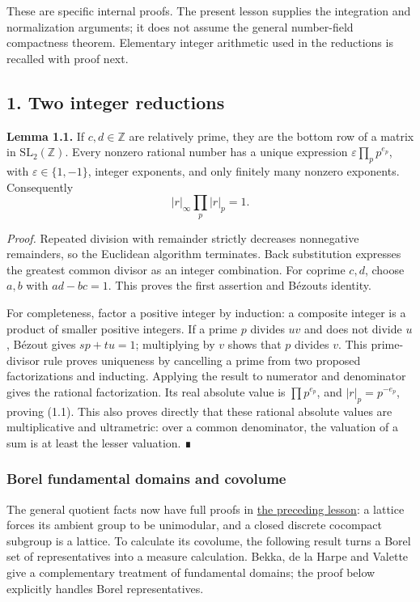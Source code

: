 \documentclass[
  english,
  11pt,
  a4paper,
]{article}
\begin{document}
These are specific internal proofs. The present lesson supplies the
integration and normalization arguments; it does not assume the general
number-field compactness theorem. Elementary integer arithmetic used in
the reductions is recalled with proof next.

\subsection{1. Two integer
reductions}\label{finite-covolume-and-arithmetic-quotients--1-two-integer-reductions}

\textbf{Lemma 1.1.} If \(c,d\in\mathbb Z\) are relatively prime, they
are the bottom row of a matrix in \(\mathrm{SL}_2(\mathbb Z)\). Every
nonzero rational number has a unique expression
\(\varepsilon\prod_p p^{e_p}\), with \(\varepsilon\in\{1,-1\}\), integer
exponents, and only finitely many nonzero exponents. Consequently
\[|r|_\infty\prod_p|r|_p=1.
\tag{1.1}\]

\emph{Proof.} Repeated division with remainder strictly decreases
nonnegative remainders, so the Euclidean algorithm terminates. Back
substitution expresses the greatest common divisor as an integer
combination. For coprime \(c,d\), choose \(a,b\) with \(ad-bc=1\). This
proves the first assertion and Bézout\textquotesingle s identity.

For completeness, factor a positive integer by induction: a composite
integer is a product of smaller positive integers. If a prime \(p\)
divides \(uv\) and does not divide \(u\), Bézout gives \(sp+tu=1\);
multiplying by \(v\) shows that \(p\) divides \(v\). This prime-divisor
rule proves uniqueness by cancelling a prime from two proposed
factorizations and inducting. Applying the result to numerator and
denominator gives the rational factorization. Its real absolute value is
\(\prod p^{e_p}\), and \(|r|_p=p^{-e_p}\), proving (1.1). This also
proves directly that these rational absolute values are multiplicative
and ultrametric: over a common denominator, the valuation of a sum is at
least the lesser valuation. ∎

\subsubsection{Borel fundamental domains and
covolume}\label{finite-covolume-and-arithmetic-quotients--borel-fundamental-domain}

The general quotient facts now have full proofs in
\hyperref[quotient-measures-and-weils-integration-formula--finite-covolume-unimodularity]{the
preceding lesson}: a lattice forces its ambient group to be unimodular,
and a closed discrete cocompact subgroup is a lattice. To calculate its
covolume, the following result turns a Borel set of representatives into
a measure calculation. Bekka, de la Harpe and Valette give a
complementary treatment of fundamental domains; the proof below
explicitly handles Borel representatives.
\end{document}
